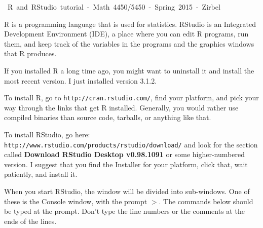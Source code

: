 
\newcommand{\url}[1]{{\tt #1}}      %



\renewcommand{\baselinestretch}{1.1}

\begin{center} \mbox{\sc
R and RStudio tutorial - Math 4450/5450 - Spring 2015 - Zirbel}\\
\end{center}

\renewcommand{\blist}[1]{\begin{list}{{\arabic{enumi}:}}{\usecounter{enumi}\setlength{\itemsep}{#1}}}
\renewcommand{\elist}{\end{list}}

R is a programming language that is used for statistics.
RStudio is an Integrated Development Environment (IDE), a place where you can edit R programs, run them, and keep track of the variables in the programs and the graphics windows that R produces.


If you installed R a long time ago, you might want to uninstall it and install the most recent version.  I just installed version 3.1.2.

To install R, go to \url{http://cran.rstudio.com/}, find your platform, and pick your way through the links that get R installed.  Generally, you would rather use compiled binaries than source code, tarballs, or anything like that.

To install RStudio, go here:  \url{http://www.rstudio.com/products/rstudio/download/} and look for the section called {\bf Download RStudio Desktop v0.98.1091} or some higher-numbered version.
I suggest that you find the Installer for your platform, click that, wait patiently, and install it.

When you start RStudio, the window will be divided into sub-windows.
One of these is the Console window, with the prompt $>$.
The commands below should be typed at the prompt.
Don't type the line numbers or the comments at the ends of the lines.

